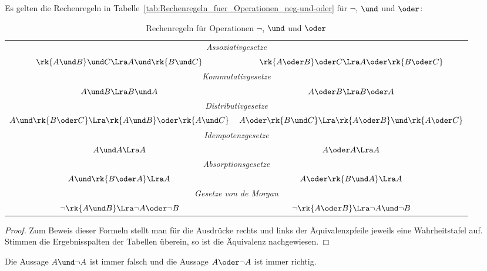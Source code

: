 \begin{theorem}
Es gelten die Rechenregeln in Tabelle~\vref{tab:Rechenregeln_fuer_Operationen_neg-und-oder} für $\neg$, $\und$ und $\oder$:
\begin{table}[htb]
\centering
\begin{tabular}{cc}
\toprule
\multicolumn{2}{c}{\emph{Assoziativgesetze}}\\
$\rk{A \und B} \und C \Lra A \und \rk{B \und C}$ & $\rk{A \oder B} \oder C \Lra A \oder \rk{B \oder C}$
\\\midrule

\multicolumn{2}{c}{\emph{Kommutativgesetze}}\\
$A \und B \Lra B \und A$ & $A \oder B \Lra B \oder A$
\\\midrule

\multicolumn{2}{c}{\emph{Distributivgesetze}}\\
$A \und \rk{B \oder C} \Lra \rk{A \und B} \oder \rk{A \und C}$ & $A \oder \rk{B \und C} \Lra \rk{A \oder B} \und \rk{A \oder C}$
\\\midrule

\multicolumn{2}{c}{\emph{Idempotenzgesetze}}\\
$A \und A \Lra A$ & $A \oder A \Lra A$
\\\midrule

\multicolumn{2}{c}{\emph{Absorptionsgesetze}}\\
$A \und \rk{B \oder A} \Lra A$ & $A \oder \rk{B \und A} \Lra A$
\\\midrule

\multicolumn{2}{c}{\emph{Gesetze von de Morgan}}\\
$\neg \rk{A \und B} \Lra \neg A \oder \neg B$ & $\neg \rk{A \oder B} \Lra \neg A \und \neg B$
\\\bottomrule
\end{tabular}
\label{tab:Rechenregeln_fuer_Operationen_neg-und-oder}
\caption{Rechenregeln für Operationen $\neg$, $\und$ und $\oder$}
\end{table}
\end{theorem}

\begin{proof}
Zum Beweis dieser Formeln stellt man für die Ausdrücke rechts und links der Äquivalenzpfeile jeweils eine Wahrheitstafel auf. Stimmen die Ergebnisspalten der Tabellen überein, so ist die Äquivalenz nachgewiesen.
\end{proof}

Die Aussage $A \und \neg A$ ist immer falsch und die Aussage $A \oder \neg A$ ist immer richtig.

